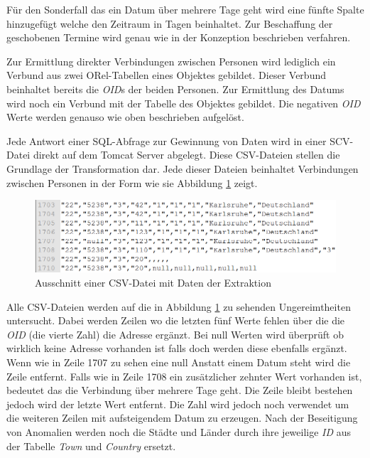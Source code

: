 Für den Sonderfall das ein Datum über mehrere Tage geht wird eine fünfte Spalte hinzugefügt welche den Zeitraum in Tagen beinhaltet. Zur Beschaffung der geschobenen Termine wird genau wie in der Konzeption beschrieben verfahren.

Zur Ermittlung direkter Verbindungen zwischen Personen wird lediglich ein Verbund aus zwei ORel-Tabellen eines Objektes gebildet. Dieser Verbund beinhaltet bereits die \textit{OID}s der beiden Personen. Zur Ermittlung des Datums wird noch ein Verbund mit der Tabelle des Objektes gebildet. Die negativen \textit{OID} Werte werden genauso wie oben beschrieben aufgelöst. 

Jede Antwort einer SQL-Abfrage zur Gewinnung von Daten wird in einer SCV-Datei direkt auf dem Tomcat Server abgelegt. Diese CSV-Dateien stellen die Grundlage der Transformation dar. Jede dieser Dateien beinhaltet Verbindungen zwischen Personen in der Form wie sie Abbildung \ref{fig:umsetzung_csv_datei} zeigt. 

\begin{figure}[htbp]
\begin{center}
\includegraphics[width=1.0\textwidth]{pics/umsetzung_csv_datei.png}
\caption{Ausschnitt einer CSV-Datei mit Daten der Extraktion}
\label{fig:umsetzung_csv_datei}
\end{center}
\end{figure}

Alle CSV-Dateien werden auf die in Abbildung \ref{fig:umsetzung_csv_datei} zu sehenden Ungereimtheiten untersucht. Dabei werden Zeilen wo die letzten fünf Werte fehlen über die die \textit{OID} (die vierte Zahl) die Adresse ergänzt. Bei null Werten wird überprüft ob wirklich keine Adresse vorhanden ist falls doch werden diese ebenfalls ergänzt. Wenn wie in Zeile 1707 zu sehen eine null Anstatt einem Datum steht wird die Zeile entfernt. Falls wie in Zeile 1708 ein zusätzlicher zehnter Wert vorhanden ist, bedeutet das die Verbindung über mehrere Tage geht. Die Zeile bleibt bestehen jedoch wird der letzte Wert entfernt. Die Zahl wird jedoch noch verwendet um die weiteren Zeilen mit aufsteigendem Datum zu erzeugen. Nach der Beseitigung von Anomalien werden noch die Städte und Länder durch ihre jeweilige \textit{ID} aus der Tabelle \textit{Town} und \textit{Country} ersetzt.

